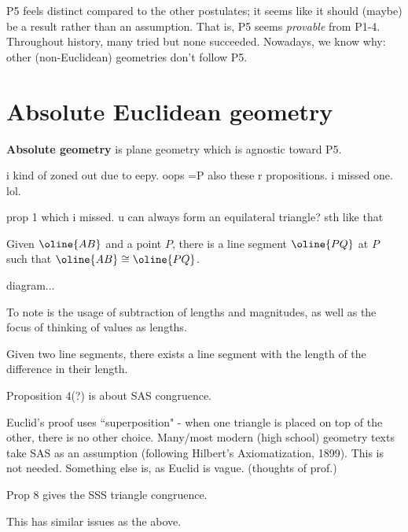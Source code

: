 \documentclass{article}
\begin{document}
P5 feels distinct compared to the other postulates; it seems like it should (maybe) be a result
rather than an assumption. That is, P5 seems \textit{provable} from P1-4. Throughout history, many
tried but none succeeded. Nowadays, we know why: other (non-Euclidean) geometries don't follow P5.

\newpage
\section{Absolute Euclidean geometry}

\begin{defn}
    \textbf{Absolute geometry} is plane geometry which is agnostic toward P5.
\end{defn}
i kind of zoned out due to eepy. oops =P also these r propositions. i missed one. lol.

\begin{lm}[title=Prop. 1]
    prop 1 which i missed. u can always form an equilateral triangle? sth like that
\end{lm}

\begin{lm}[title=Prop. 2]
    Given $ \oline{AB} $ and a point $ P $, there is a line segment $ \oline{PQ} $ at $ P $
    such that $ \oline{AB} \cong \oline{PQ} $.
\end{lm}
diagram...

To note is the usage of subtraction of lengths and magnitudes, as well as the focus of thinking of
values as lengths.

\begin{lm}[title=Prop. 3]
    Given two line segments, there exists a line segment with the length of the difference in their
    length.
\end{lm}

\begin{lm}[title=Prop. 4]
    Proposition 4(?) is about SAS congruence.
\end{lm}
Euclid's proof uses ``superposition" - when one triangle is placed on top of the other,
there is no other choice. Many/most modern (high school) geometry texts take SAS as an assumption
(following Hilbert's Axiomatization, 1899). This is not needed. Something else is, as Euclid
is vague. (thoughts of prof.)

\begin{lm}[title=Prop. 8]
    Prop 8 gives the SSS triangle congruence.
\end{lm}
This has similar issues as the above.
\end{document}

